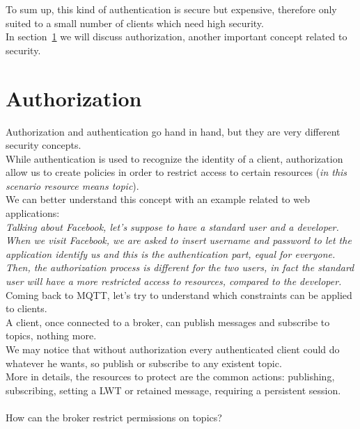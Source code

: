 \documentclass[12pt]{report}
\begin{document}
{{\begin{itemize}
\begin{itemize}
\begin{enumerate}
\end{enumerate}
\end{itemize}
\end{itemize}


To sum up, this kind of authentication is secure but expensive, therefore only suited to a small number of clients which need high security. \\

In section~\ref{sec:mqttauth} we will discuss authorization, another important concept related to security.\\


\section{Authorization}
\label{sec:mqttauth}
\bigskip
Authorization and authentication go hand in hand, but they are very different security concepts.\\
While authentication is used to recognize the identity of a client, authorization allow us to create policies in order to restrict access to certain resources (\emph{in this scenario resource means topic}).\\
We can better understand this concept with an example related to web applications:\\

\emph{Talking about Facebook, let's suppose to have a standard user and a developer.
When we visit Facebook, we are asked to insert username and password to let the application identify us and this is the authentication part, equal for everyone.
Then, the authorization process is different for the two users, in fact the standard user will have a more restricted access to resources, compared to the developer.}\\

Coming back to MQTT, let's try to understand which constraints can be applied to clients.\\
A client, once connected to a broker, can publish messages and subscribe to topics, nothing more.\\
We may notice that without authorization every authenticated client could do whatever he wants, so publish or subscribe to any existent topic.\\
More in details, the resources to protect are the common actions: publishing, subscribing, setting a LWT or retained message, requiring a persistent session.\\\\
How can the broker restrict permissions on topics?\\

}}
\end{document}
